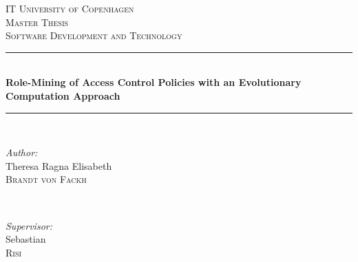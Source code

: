 \begin{titlepage}

\newcommand{\HRule}{\rule{\linewidth}{0.5mm}} %

\center %
 

\textsc{\LARGE IT University of Copenhagen}\\[1.5cm] %
\textsc{\Large Master Thesis}\\[0.5cm] %
\textsc{\large Software Development and Technology}\\[0.5cm] %


\HRule \\[0.4cm]
{ \huge \bfseries Role-Mining of Access Control Policies with an Evolutionary Computation Approach}\\[0.4cm] %
\HRule \\[1.5cm]
 

\begin{minipage}{0.4\textwidth}
\begin{flushleft} \large
\emph{Author:}\\
Theresa Ragna Elisabeth\\ \textsc{Brandt von Fackh} %
\end{flushleft}
\end{minipage}
~
\begin{minipage}{0.4\textwidth}
\begin{flushright} \large
\emph{Supervisor:} \\
Sebastian \\\textsc{Risi} %
\end{flushright}
\end{minipage}\\[2cm]


\end{titlepage}
